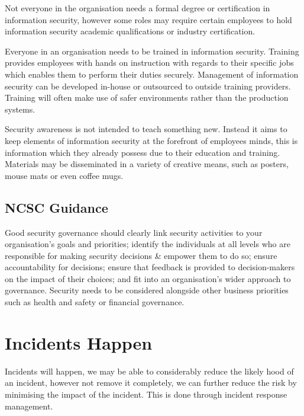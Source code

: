 Not everyone in the organisation needs a formal degree or certification in information security, however some roles may require certain employees to hold information security academic qualifications or industry certification.

Everyone in an organisation needs to be trained in information security. Training provides employees with hands on instruction with regards to their specific jobs which enables them to perform their duties securely. Management of information security can be developed in-house or outsourced to outside training providers. Training will often make use of safer environments rather than the production systems. 

Security awareness is not intended to teach something new. Instead it aims to keep elements of information security at the forefront of employees minds, this is information which they already possess due to their education and training. Materials may be disseminated in a variety of creative means, such as posters, mouse mats or even coffee mugs. 

\subsection*{NCSC Guidance}
Good security governance should clearly link security activities to your organisation's goals and priorities; identify the individuals at all levels who are responsible for making security decisions \& empower them to do so; ensure accountability for decisions; ensure that feedback is provided to decision-makers on the impact of their choices; and fit into an organisation's wider approach to governance. Security needs to be considered alongside other business priorities such as health and safety or financial governance.

\section*{Incidents Happen}
Incidents will happen, we may be able to considerably reduce the likely hood of an incident, however not remove it completely, we can further reduce the risk by minimising the impact of the incident. This is done through incident response management. 